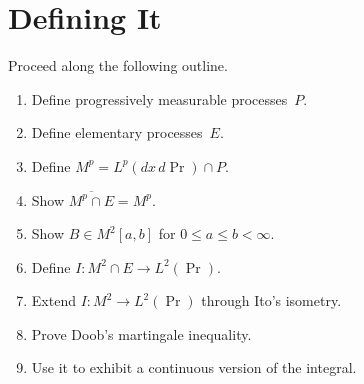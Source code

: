 \section	{Defining It}

Proceed along the following outline.
\begin	{enumerate}
\item	Define progressively measurable processes~$P$.
\item	Define elementary processes~$E$.
\item	Define \( M^p = L^p(dx\,d{\Pr}) \cap P \).
\item	Show \( \overline{M^p \cap E} = M^p \).
\item	Show \( B \in M^2[a,b] \) for \( 0 \le a \le b < \infty \).
\item	Define \( I \colon M^2 \cap E \to L^2({\Pr}) \).
\item	Extend \( I \colon M^2 \to L^2({\Pr}) \) through Ito's isometry.
\item	Prove Doob's martingale inequality.
\item	Use it to exhibit a continuous version of the integral.
\end	{enumerate}
